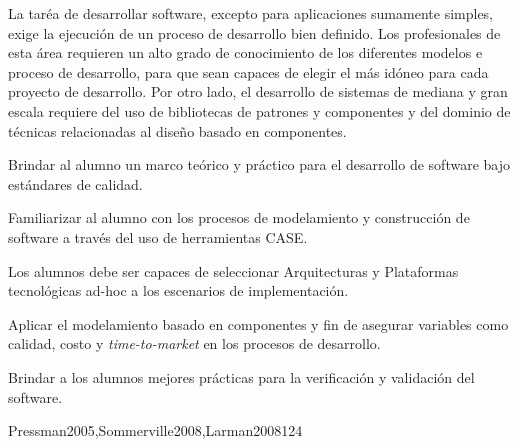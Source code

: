 \begin{syllabus}


\begin{justification}
La taréa de desarrollar software, excepto para aplicaciones sumamente simples, exige la ejecución de un proceso de desarrollo bien definido. 
Los profesionales de esta área requieren un alto grado de conocimiento de los diferentes modelos e proceso de desarrollo, 
para que sean capaces de elegir el más idóneo para cada proyecto de desarrollo. Por otro lado, el desarrollo de sistemas 
de mediana y gran escala requiere del uso de bibliotecas de patrones y componentes y del dominio de técnicas relacionadas al 
diseño basado en componentes.
\end{justification}

\begin{goals}
\item Brindar al alumno un marco teórico y práctico para el desarrollo de software bajo estándares de calidad.
\item Familiarizar al alumno con los procesos de modelamiento y construcción de software a través del uso de herramientas CASE.
\item Los alumnos debe ser capaces de seleccionar Arquitecturas y Plataformas tecnológicas ad-hoc a los escenarios de implementación.
\item Aplicar el modelamiento basado en componentes y fin de asegurar variables como calidad, costo  y {\it time-to-market} en los procesos de desarrollo.
\item Brindar a los alumnos mejores prácticas para la verificación y validación del software.
\end{goals}

\begin{outcomes}
\end{outcomes}

\begin{unit}{\SESoftwareDesignDef}{Pressman2005,Sommerville2008,Larman2008}{12}{4}
    \SESoftwareDesignAllTopics
    \SESoftwareDesignAllObjectives
\end{unit}


\end{syllabus}
